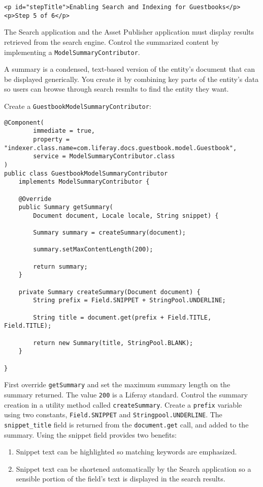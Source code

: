 \begin{verbatim}
<p id="stepTitle">Enabling Search and Indexing for Guestbooks</p><p>Step 5 of 6</p>
\end{verbatim}

The Search application and the Asset Publisher application must display
results retrieved from the search engine. Control the summarized content
by implementing a \texttt{ModelSummaryContributor}.

A summary is a condensed, text-based version of the entity's document
that can be displayed generically. You create it by combining key parts
of the entity's data so users can browse through search resmlts to find
the entity they want.

Create a \texttt{GuestbookModelSummaryContributor}:

\begin{verbatim}
@Component(
        immediate = true,
        property = "indexer.class.name=com.liferay.docs.guestbook.model.Guestbook",
        service = ModelSummaryContributor.class
)
public class GuestbookModelSummaryContributor
    implements ModelSummaryContributor {

    @Override
    public Summary getSummary(
        Document document, Locale locale, String snippet) {

        Summary summary = createSummary(document);

        summary.setMaxContentLength(200);

        return summary;
    }

    private Summary createSummary(Document document) {
        String prefix = Field.SNIPPET + StringPool.UNDERLINE;

        String title = document.get(prefix + Field.TITLE, Field.TITLE);

        return new Summary(title, StringPool.BLANK);
    }

}
\end{verbatim}

First override \texttt{getSummary} and set the maximum summary length on
the summary returned. The value \texttt{200} is a Liferay standard.
Control the summary creation in a utility method called
\texttt{createSummary}. Create a \texttt{prefix} variable using two
constants, \texttt{Field.SNIPPET} and \texttt{Stringpool.UNDERLINE}. The
\texttt{snippet\_title} field is returned from the \texttt{document.get}
call, and added to the summary. Using the snippet field provides two
benefits:

\begin{enumerate}
\def\labelenumi{\arabic{enumi}.}
\item
  Snippet text can be highlighted so matching keywords are emphasized.
\item
  Snippet text can be shortened automatically by the Search application
  so a sensible portion of the field's text is displayed in the search
  results.
\end{enumerate}

